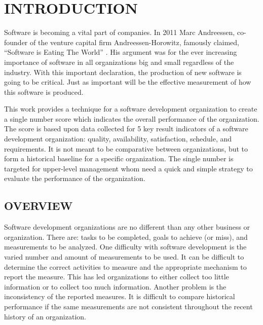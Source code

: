 \documentclass[SDSUThesis.tex]{subfiles}
\begin{document}
\newpage
{}
\setcounter{tocdepth}{2}

\section{INTRODUCTION}

    Software is becoming a vital part of companies. In 2011 Marc Andreessen, 
    co-founder of the venture capital firm Andreessen-Horowitz,
    famously claimed, ``Software is Eating The World'' \cite{Andreessen2001}. 
    His argument was for the ever increasing importance of software
    in all organizations big and small regardless of the industry.  With 
    this important declaration, the production of new software is
    going to be critical.  Just as important will be the effective 
    measurement of how this software is produced.  
    
    This work 
    provides a technique for a software development organization to create
    a single number score which indicates the overall performance
    of the organization. The
    score is based upon data collected for 5 key result indicators
    of a software development organization: quality, availability,
    satisfaction, schedule, and requirements.  It is not meant
    to be comparative between organizations, but to 
    form a historical baseline for a specific organization.  The single
    number is targeted for upper-level management whom need a quick
    and simple strategy to evaluate the performance of the organization.

\subsection{OVERVIEW}
    
    Software development organizations are no different than 
    any other business or organization.  There are: tasks
    to be completed, goals to achieve (or miss), and measurements
    to be analyzed.  One difficulty with software development
    is the varied number and amount of measurements to be used. 
    It can be difficult to determine the correct activities
    to measure and the appropriate mechanism to report the measure.
    This has led organizations to either collect too little information
    or to collect too much information.  Another problem is the 
    inconsistency of the reported measures.  It is difficult to compare
    historical performance if the same measurements are not consistent
    throughout the recent history of an organization. 
    
\end{document}
